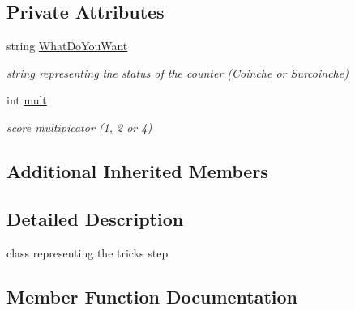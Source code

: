 \subsection*{Private Attributes}
\begin{DoxyCompactItemize}
\item 
string \hyperlink{class_server_1_1_game_rules_1_1_steps_1_1_counter_1_1_counter_ad8d4f8ccac9f1aff4fe285de35a60f71}{What\+Do\+You\+Want}
\begin{DoxyCompactList}\small\item\em string representing the status of the counter (\hyperlink{namespace_coinche}{Coinche} or Surcoinche) \end{DoxyCompactList}\item 
int \hyperlink{class_server_1_1_game_rules_1_1_steps_1_1_counter_1_1_counter_a073b124596a28a8eebeb1dd4715ed6cf}{mult}
\begin{DoxyCompactList}\small\item\em score multipicator (1, 2 or 4) \end{DoxyCompactList}\end{DoxyCompactItemize}
\subsection*{Additional Inherited Members}


\subsection{Detailed Description}
class representing the tricks step 



\subsection{Member Function Documentation}
\mbox{\label{class_server_1_1_game_rules_1_1_steps_1_1_counter_1_1_counter_aba717018db3366659fdb4ac302d19937}} 
